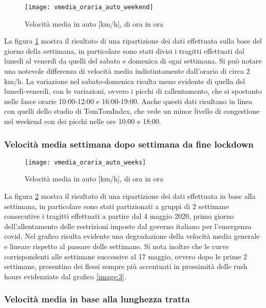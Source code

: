 \begin{figure}[H]
\texttt{[image: vmedia\_oraria\_auto\_weekend]}
\caption{Velocità media in auto [km/h], di ora in ora}
\label{image:4}
\end{figure}

La figura \ref{image:4} mostra il risultato di una ripartizione dei dati effettuata sulla base del giorno della settimana, in particolare sono stati divisi i tragitti effettuati dal lunedì al venerdì da quelli del sabato e domenica di ogni settimana. Si può notare una notevole differenza di velocità media indistintamente dall'orario di circa 2 km/h. La variazione nel sabato-domenica risulta meno evidente di quella del lunedì-venerdì, con le variazioni, ovvero i picchi di rallentamento, che si spostanto nelle fasce orarie 10:00-12:00 e 16:00-19:00. Anche questi dati risultano in linea con quelli dello studio di TomTomIndex\cite{tomtomindexmilan}, che vede un minor livello di congestione nel weekend con dei picchi nelle ore 10:00 e 18:00.

\subsubsection{Velocità media settimana dopo settimana da fine lockdown}

\begin{figure}[H]
\texttt{[image: vmedia\_oraria\_auto\_weeks]}
\caption{Velocità media in auto [km/h], di ora in ora}
\label{image:5}
\end{figure}

La figura \ref{image:5} mostra il risultato di una ripartizione dei dati effettuata in base alla settimana, in particolare sono stati partizionati a gruppi di 2 settimane consecutive i tragitti effettuati a partire dal 4 maggio 2020, primo giorno dell'allentamento delle restrizioni imposte dal governo italiano per l'emergenza covid\cite{dpcm26aprile}. Nel grafico risulta evidente una degradazione della velocità media generale e lineare rispetto al passare delle settimane. Si nota inoltre che le curve corrispondenti alle settimane successive al 17 maggio, ovvero dopo le prime 2 settimane, presentino dei flessi sempre più accentuati in prossimità delle rush hours evidenziate dal grafico \ref{image:3}.

\subsubsection{Velocità media in base alla lunghezza tratta}

